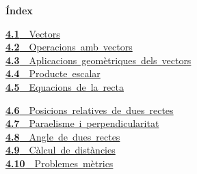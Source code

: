 \documentclass[11pt,a4paper]{article}
\begin{document}
\begin{tcolorbox}[colback=fmsurface,colframe=fmsurface,arc=3mm,left=4mm,right=4mm,top=2mm,bottom=2mm]
\small\textbf{Índex}\par\smallskip
\begin{minipage}[t]{0.49\linewidth}\small \mbox{\hyperlink{sec1}{\textbf{\color{fmgreen}4.1}\ \ Vectors}}\\[3pt]
\mbox{\hyperlink{sec2}{\textbf{\color{fmgreen}4.2}\ \ Operacions amb vectors}}\\[3pt]
\mbox{\hyperlink{sec3}{\textbf{\color{fmgreen}4.3}\ \ Aplicacions geomètriques dels vectors}}\\[3pt]
\mbox{\hyperlink{sec4}{\textbf{\color{fmgreen}4.4}\ \ Producte escalar}}\\[3pt]
\mbox{\hyperlink{sec5}{\textbf{\color{fmgreen}4.5}\ \ Equacions de la recta}}\\[3pt]\end{minipage}\hfill\begin{minipage}[t]{0.49\linewidth}\small \mbox{\hyperlink{sec6}{\textbf{\color{fmgreen}4.6}\ \ Posicions relatives de dues rectes}}\\[3pt]
\mbox{\hyperlink{sec7}{\textbf{\color{fmgreen}4.7}\ \ Para\lgem{}elisme i perpendicularitat}}\\[3pt]
\mbox{\hyperlink{sec8}{\textbf{\color{fmgreen}4.8}\ \ Angle de dues rectes}}\\[3pt]
\mbox{\hyperlink{sec9}{\textbf{\color{fmgreen}4.9}\ \ Càlcul de distàncies}}\\[3pt]
\mbox{\hyperlink{sec10}{\textbf{\color{fmgreen}4.10}\ \ Problemes mètrics}}\\[3pt]\end{minipage}
\end{tcolorbox}

\end{document}
